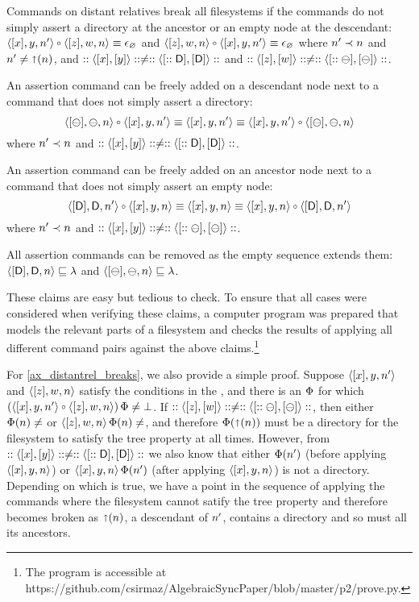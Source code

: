 \begin{mylem}
\begin{list}{\bf Rule~.}{}
\item{}
Commands on distant relatives break all filesystems
if the commands do not simply assert a directory at the ancestor
or an empty node at the descendant:
$\cxynnv\cc\czwnv \equiv \cbrk$
and $\czwnv\cc\cxynnv \equiv\cbrk$
where $n'\prec n$ and $n'\neq\mathord{\shortuparrow}(n)$, and $::\langle{[x],[y]}\rangle::\neq::\langle{[::\mathsf{D}],[\mathsf{D}]}\rangle::$ and $::\langle{[z],[w]}\rangle::\neq::\langle{[::\ominus],[\ominus]}\rangle::$.

\item{}
An assertion command can be freely added on a descendant node
next to a command that does not simply assert a directory:
\[ \cbba{n}\cc\cxynnv \equiv \cxynnv \equiv \cxynnv\cc\cbba{n} \] 
where $n'\prec n$ and $::\langle{[x],[y]}\rangle::\neq::\langle{[::\mathsf{D}],[\mathsf{D}]}\rangle::$.

\item{}
An assertion command can be freely added on an ancestor node
next to a command that does not simply assert an empty node:
\[ \cdda{\nn}\cc\cxynv \equiv \cxynv \equiv \cxynv\cc\cdda{\nn} \]
where $n'\prec n$ and $::\langle{[x],[y]}\rangle::\neq::\langle{[::\ominus],[\ominus]}\rangle::$.

\item{}
All assertion commands can be removed as the empty sequence extends them:
$\langle{[\mathsf{D}],\mathsf{D},n}\rangle\sqsubseteq\lambda$ and $\langle{[\ominus],\ominus,n}\rangle\sqsubseteq\lambda$.

\end{list}
\end{mylem}

These claims are easy but tedious to check.
To ensure that all cases were considered when verifying these claims,
a computer program was prepared that models the relevant parts of
a filesystem and checks the results of applying all different command pairs
against the above claims.\footnote{The program is accessible at \\ 
https://github.com/csirmaz/AlgebraicSyncPaper/blob/master/p2/prove.py.}

For \cref{ax_distantrel_breaks}, we also provide a simple proof.
Suppose $\langle{[x],y,n'}\rangle$ and $\langle{[z],w,n}\rangle$ satisfy the conditions in the ,
and there is an $\Phi$ for which $(\cxynnv\cc\czwnv)\aFS\neq\fsbroken$.
If $::\langle{[z],[w]}\rangle::\neq::\langle{[::\ominus],[\ominus]}\rangle::$, then either $\FS(n)\neq\empty$ or $\czwnv\aFS(n)\neq\empty$,
and therefore $\Phi(\mathord{\shortuparrow}({n}))$ must be a directory for the filesystem to satisfy
the tree property at all times.
However, from $::\langle{[x],[y]}\rangle::\neq::\langle{[::\mathsf{D}],[\mathsf{D}]}\rangle::$ we also know that either $\Phi(n')$ 
(before applying $\langle{[x],y,n}\rangle$) or $\langle{[x],y,n}\rangle\,\Phi(n')$ (after applying $\langle{[x],y,n}\rangle$)
is not a directory. Depending on which is true, we have a point in the sequence
of applying the commands where the filesystem cannot satify the tree property
and therefore becomes broken as $\mathord{\shortuparrow}({n})$, a descendant of $n'$, contains
a directory and so must all its ancestors.

